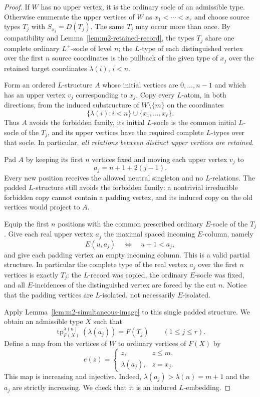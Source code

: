 \begin{proof}
If $W$ has no upper vertex, it is the ordinary socle of an
admissible type.  Otherwise enumerate the upper vertices of $W$ as
$x_1<\cdots<x_r$ and choose source types $T_j$ with
$S_{x_j}=D(T_j)$.  The same $T_j$ may occur more than once.  By
compatibility and Lemma~\ref{lem:m2-retained-record}, the types
$T_j$ share one complete ordinary $L^+$-socle of level $n$; the
$L$-type of each distinguished vertex over the first $n$ source
coordinates is the pullback of the given type of $x_j$ over the
retained target coordinates $\lambda(i)$, $i<n$.

Form an ordered $L$-structure $A$ whose initial vertices are
$0,\ldots,n-1$ and which has an upper vertex $v_j$ corresponding to
$x_j$.  Copy every $L$-atom, in both directions, from the induced
substructure of $W\setminus\{m\}$ on the coordinates
\[
  \{\lambda(i):i<n\}\cup\{x_1,\ldots,x_r\}.
\]
Thus $A$ avoids the forbidden family, its initial $L$-socle is the
common initial $L$-socle of the $T_j$, and its upper vertices have
the required complete $L$-types over that socle.  In particular,
\emph{all relations between distinct upper vertices are retained}.

Pad $A$ by keeping its first $n$ vertices fixed and moving each
upper vertex $v_j$ to
\[
       a_j=n+1+2(j-1).
\]
Every new position receives the allowed neutral singleton and no
$L$-relations.  The padded $L$-structure still avoids the forbidden
family: a nontrivial irreducible forbidden copy cannot contain a
padding vertex, and its induced copy on the old vertices would
project to $A$.

Equip the first $n$ positions with the common prescribed ordinary
$E$-socle of the $T_j$.  Give each real upper vertex $a_j$ the
maximal spaced incoming $E$-column, namely
\[
       E(u,a_j)\quad\Longleftrightarrow\quad u+1<a_j,
\]
and give each padding vertex an empty incoming column.  This is a
valid partial structure.  In particular the complete type of the
real vertex $a_j$ over the first $n$ vertices is exactly $T_j$:
the $L$-record was copied, the ordinary $E$-socle was fixed, and all
$E$-incidences of the distinguished vertex are forced by the cut
$n$.  Notice that the padding vertices are $L$-isolated, not
necessarily $E$-isolated.

Apply Lemma~\ref{lem:m2-simultaneous-image} to this single padded
structure.  We obtain an admissible type $X$ such that
\[
  \operatorname{tp}^{\lambda(n)}_{F(X)}(\lambda(a_j))=F(T_j)
     \qquad(1\leq j\leq r).
\]
Define a map from the vertices of $W$ to ordinary vertices of $F(X)$
by
\[
  e(z)=\begin{cases}
       z,&z\leq m,\\
       \lambda(a_j),&z=x_j.
       \end{cases}
\]
This map is increasing and injective.  Indeed,
$\lambda(a_j)>\lambda(n)=m+1$ and the $a_j$ are strictly increasing.
We check that it is an induced $L$-embedding.


\end{proof}
